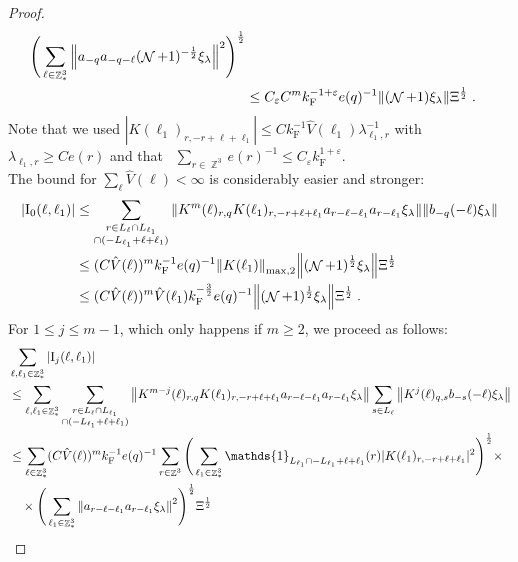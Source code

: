 \documentclass[12pt,a4paper]{article}
\numberwithin{equation}{section}
\newcommand{\1}{\mathbb{I}}
\newcommand{\F}{\mathrm{F}}
\newcommand{\I}{\mathrm{I}}
\DeclareMathOperator{\Z}{\mathbb{Z}}
\DeclareMathOperator{\NN}{\mathcal{N}}
\newcommand{\half}{\frac{1}{2}}
\theoremstyle{plain}
\theoremstyle{definition}
\theoremstyle{remark}
\theoremstyle{plain}
\theoremstyle{definition}
\theoremstyle{remark}
\begin{document}
\begin{proof}
{\begin{align}
		\Bigg( \sum_{\ell \in \Z^3_*} \norm{ a_{-q} a_{-q-\ell} (\NN+1)^{-\half} \xi_\lambda}^2 \Bigg)^{\half} \nonumber\\
	&\leq C_\varepsilon C^m k_{\F}^{-1 + \varepsilon} e(q)^{-1}
		\norm{ (\NN+1) \xi_\lambda } \Xi^{\half} \;. \label{eq:estEQ2151_Coulomb}
\end{align}
Note that we used $ |K(\ell_1)_{r,-r+\ell+\ell_1}| \le C k_{\F}^{-1} \hat{V}(\ell_1) \lambda_{\ell_1,r}^{-1} $ with $ \lambda_{\ell_1,r} \ge C e(r) $ and that~\cite[Lemma~3.2]{CHN24} $ \sum_{r \in \Z^3} e(r)^{-1} \le C_\varepsilon k_{\F}^{1+\varepsilon} $.\\
The bound for $ \sum_{\ell} \hat{V}(\ell) < \infty $ is considerably easier and stronger:
}
\begin{align}
	|\I_0(\ell, \ell_1)|
	&\leq \sum\limits_{\substack{r\in L_{\ell} \cap L_{\ell_1} \\ \cap (-L_{\ell_1}+\ell+\ell_1)}} \norm{K^m(\ell)_{r,q} K(\ell_1)_{r,-r+\ell+\ell_1} a_{r-\ell-\ell_1} a_{r-\ell_1} \xi_\lambda}\norm{ b_{-q}(-\ell) \xi_\lambda}\nonumber\\
	&\leq (C \hat{V}(\ell))^m k_{\F}^{-1} e(q)^{-1}
		\norm{K(\ell_1)}_{\max,2} \norm{ (\NN+1)^\half \xi_\lambda } \Xi^{\half} \nonumber\\
	&\leq (C \hat{V}(\ell))^m
		\hat{V}(\ell_1)
		k_{\F}^{-\frac 32} e(q)^{-1}
		\norm{ (\NN+1)^\half \xi_\lambda } \Xi^{\half} \;. \label{eq:estEQ2151}
\end{align}
\textcolor{green!30!black}{
For $ 1 \le j \le m-1 $, which only happens if $ m \ge 2 $, we proceed as follows:
\begin{align}
	&\sum_{\ell,\ell_1 \in \Z^3_*} |\I_j(\ell, \ell_1)| \nonumber\\
	&\leq \sum_{\ell,\ell_1 \in \Z^3_*} \sum\limits_{\substack{r\in L_{\ell} \cap L_{\ell_1}\\ \cap (-L_{\ell_1}+\ell+\ell_1)}}
		\norm{ K^{m-j}(\ell)_{r,q} K(\ell_1)_{r,-r+\ell+\ell_1} a_{r-\ell-\ell_1} a_{r-\ell_1} \xi_\lambda}
		\sum\limits_{s \in L_{\ell}}
		\norm{ K^j(\ell)_{q,s} b_{-s}(-\ell) \xi_\lambda }\nonumber\\
	&\leq \sum_{\ell \in \Z^3_*} (C \hat{V}(\ell))^m k_{\F}^{-1} e(q)^{-1}
		\sum_{r \in \Z^3}
		\Bigg( \sum_{\ell_1 \in \Z^3_*} \mathds{1}_{L_{\ell_1} \cap -L_{\ell_1}+\ell+\ell_1 }(r) |K(\ell_1)_{r,-r+\ell+\ell_1}|^2 \Bigg)^{\half} \times \nonumber\\
	&\quad \times \Bigg( \sum_{\ell_1 \in \Z^3_*} \norm{ a_{r-\ell-\ell_1} a_{r-\ell_1} \xi_\lambda}^2 \Bigg)^{\half}
		\Xi^\half \nonumber\\

\end{align}}
\end{proof}
\end{document}
